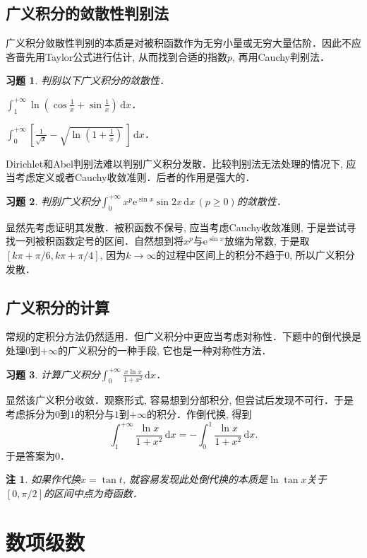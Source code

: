 \documentclass[11pt,a4paper]{ctexart}
\makeatletter
\theoremstyle{thmseries} %
\theoremstyle{exerseries}
\newtheorem{exer}{习题}[section]
\newtheorem*{rem}{注}
\renewenvironment{proof}[1][\proofname]{\par
  \pushQED{\qed}%
  \normalfont \topsep6\p@\@plus6\p@\relax
  \trivlist
  \item[\hskip\labelsep
        \itshape
    #1\@addpunct{}]\ignorespaces
}{%
  \popQED\endtrivlist\@endpefalse
}
\newenvironment{sol}{\begin{proof}[\bfseries\upshape 解\quad]}{\end{proof}}
\newcommand{\bra}[1]{\mathopen{}\left(#1\right)}
\newcommand{\sbra}[1]{\mathopen{}\left[#1\right]}
\renewcommand{\d}{\mathrm{d}}
\newcommand{\e}{\mathrm{e}}
\makeatother
\begin{document}
\subsection{广义积分的敛散性判别法}
广义积分敛散性判别的本质是对被积函数作为无穷小量或无穷大量估阶．因此不应吝啬先用Taylor公式进行估计, 从而找到合适的指数$p$, 再用Cauchy判别法．
\begin{exer}
	判别以下广义积分的敛散性．
	\begin{enumerate}
	\end{enumerate}
\end{exer}

Dirichlet和Abel判别法难以判别广义积分发散．比较判别法无法处理的情况下, 应当考虑定义或者Cauchy收敛准则．后者的作用是强大的．
\begin{exer}
	判别广义积分$\int_{0}^{+\infty}x^p\e^{\sin x}\sin 2x\,\d x\,(p\geq0)$的敛散性．
\end{exer}
\begin{sol}
	显然先考虑证明其发散．被积函数不保号, 应当考虑Cauchy收敛准则, 于是尝试寻找一列被积函数定号的区间．自然想到将$x^p$与$\e^{\sin x}$放缩为常数, 于是取$[k\pi+\pi/6,k\pi+\pi/4]$, 因为$k\to\infty$的过程中区间上的积分不趋于$0$, 所以广义积分发散．
\end{sol}


\subsection{广义积分的计算}
常规的定积分方法仍然适用．但广义积分中更应当考虑对称性．下题中的倒代换是处理$0$到$+\infty$的广义积分的一种手段, 它也是一种对称性方法．
\begin{exer}
	计算广义积分$\int_{0}^{+\infty}\frac{x\ln x}{1+x^2}\,\d x$．
\end{exer}
\begin{sol}
	显然该广义积分收敛．观察形式, 容易想到分部积分, 但尝试后发现不可行．于是考虑拆分为$0$到$1$的积分与$1$到$+\infty$的积分．作倒代换, 得到
	\[\int_{1}^{+\infty}\frac{\ln x}{1+x^2}\,\d x=-\int_{0}^{1}\frac{\ln x}{1+x^2}\,\d x.\]
	于是答案为$0$．
\end{sol}
\begin{rem}
	如果作代换$x=\tan t$, 就容易发现此处倒代换的本质是$\ln\tan x$关于$[0,\pi/2]$的区间中点为奇函数．
\end{rem}

\section{数项级数}
\end{document}
